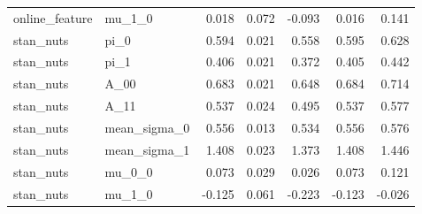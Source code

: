 \begin{tabular}{llrrrrr}
online\_feature & mu\_1\_0 & 0.018 & 0.072 & -0.093 & 0.016 & 0.141 \\
stan\_nuts & pi\_0 & 0.594 & 0.021 & 0.558 & 0.595 & 0.628 \\
stan\_nuts & pi\_1 & 0.406 & 0.021 & 0.372 & 0.405 & 0.442 \\
stan\_nuts & A\_00 & 0.683 & 0.021 & 0.648 & 0.684 & 0.714 \\
stan\_nuts & A\_11 & 0.537 & 0.024 & 0.495 & 0.537 & 0.577 \\
stan\_nuts & mean\_sigma\_0 & 0.556 & 0.013 & 0.534 & 0.556 & 0.576 \\
stan\_nuts & mean\_sigma\_1 & 1.408 & 0.023 & 1.373 & 1.408 & 1.446 \\
stan\_nuts & mu\_0\_0 & 0.073 & 0.029 & 0.026 & 0.073 & 0.121 \\
stan\_nuts & mu\_1\_0 & -0.125 & 0.061 & -0.223 & -0.123 & -0.026 \\
\bottomrule
\end{tabular}
